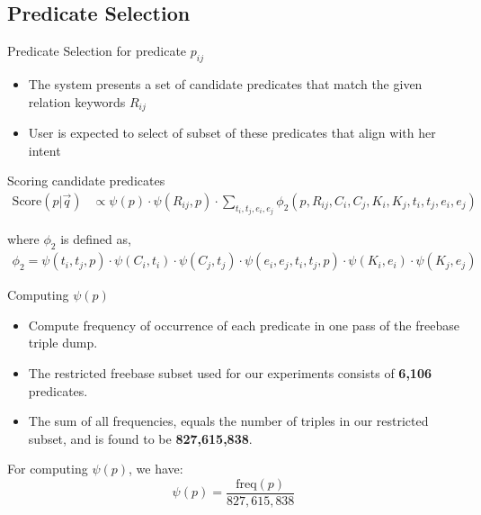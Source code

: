 \documentclass[pdf,11pt]{beamer}
\begin{document}
\subsection{Predicate Selection}

\begin{frame}{Predicate Selection for predicate $p_{ij}$}

\begin{itemize}
\item<1-> The system presents a set of candidate predicates that match the given relation keywords $R_{ij}$
\item<2-> User is expected to select of subset of these predicates that align with her intent
\end{itemize}

\vspace{11pt}


\vspace{11pt}


\end{frame}


\begin{frame}{Scoring candidate predicates}
\begin{align}
\text{Score}(p|\vec{q})& \propto \psi(p) \cdot \psi(R_{ij},p) \cdot \sum_{t_i,t_j,e_i,e_j} \phi_2(p, R_{ij}, C_i, C_j, K_i, K_j, t_i, t_j, e_i, e_j) \nonumber
\end{align}

where $\phi_2$ is defined as,
\begin{align}
\phi_2 =  \psi(t_i,t_j,p) \cdot \psi(C_i,t_i) \cdot \psi(C_j,t_j) \cdot \psi(e_i,e_j,t_i,t_j,p) \cdot \psi(K_i,e_i) \cdot \psi(K_j,e_j) \label{eq:phi2}
\nonumber
\end{align}

\end{frame}

\begin{frame}{Computing $\psi(p)$}
\begin{itemize}
\item Compute frequency of occurrence of each predicate in one pass of the freebase triple dump.
\item The restricted freebase subset used for our experiments consists of \textbf{6,106} predicates. 
\item The sum of all frequencies, equals the number of triples in our restricted subset, and is found to be \textbf{827,615,838}.
\end{itemize}
For computing $\psi(p)$, we have:
$$\psi(p) = \frac{\text{freq}(p)}{827,615,838}$$
\end{frame}
\end{document}
